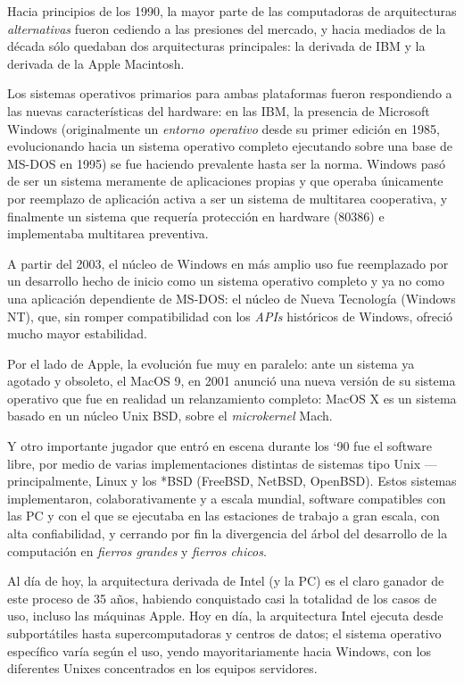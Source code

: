 \documentclass[11pt,fleqn]{book} %
\begin{document}
Hacia principios de los 1990, la mayor parte de las computadoras de
arquitecturas \emph{alternativas} fueron cediendo a las presiones del
mercado, y hacia mediados de la década sólo quedaban dos arquitecturas
principales: la derivada de IBM y la derivada de la Apple Macintosh.

Los sistemas operativos primarios para ambas plataformas fueron
respondiendo a las nuevas características del hardware: en las IBM, la
presencia de Microsoft Windows (originalmente un \emph{entorno operativo}
desde su primer edición en 1985, evolucionando hacia un sistema
operativo completo ejecutando sobre una base de MS-DOS en 1995) se fue
haciendo prevalente hasta ser la norma. Windows pasó de ser un sistema
meramente de aplicaciones propias y que operaba únicamente por reemplazo
de aplicación activa a ser un sistema de multitarea cooperativa, y
finalmente un sistema que requería protección en hardware (80386) e
implementaba multitarea preventiva.

A partir del 2003, el núcleo de Windows en más amplio uso fue
reemplazado por un desarrollo hecho de inicio como un sistema
operativo completo y ya no como una aplicación dependiente de MS-DOS:
el núcleo de Nueva Tecnología (Windows NT), que, sin romper
compatibilidad con los \emph{APIs} históricos de Windows, ofreció mucho
mayor estabilidad.

Por el lado de Apple, la evolución fue muy en paralelo: ante un
sistema ya agotado y obsoleto, el MacOS 9, en 2001 anunció una
nueva versión de su sistema operativo que fue en realidad un
relanzamiento completo: MacOS X es un sistema basado en un núcleo Unix
BSD, sobre el \emph{microkernel} Mach.

Y otro importante jugador que entró en escena durante los `90 fue el
software libre, por medio de varias implementaciones distintas de
sistemas tipo Unix — principalmente, Linux y los *BSD (FreeBSD,
NetBSD, OpenBSD). Estos sistemas implementaron, colaborativamente y a
escala mundial, software compatibles con las PC y con el que se ejecutaba en las
estaciones de trabajo a gran escala, con alta confiabilidad, y
cerrando por fin la divergencia del árbol del desarrollo de la
computación en \emph{fierros grandes} y \emph{fierros chicos}.

Al día de hoy, la arquitectura derivada de Intel (y la PC) es el claro
ganador de este proceso de 35 años, habiendo conquistado casi la
totalidad de los casos de uso, incluso las máquinas Apple.  
Hoy en día, la arquitectura Intel ejecuta
desde subportátiles hasta supercomputadoras y centros de datos; el
sistema operativo específico varía según el uso, yendo
mayoritariamente hacia Windows, con los diferentes Unixes concentrados
en los equipos servidores.
\end{document}
